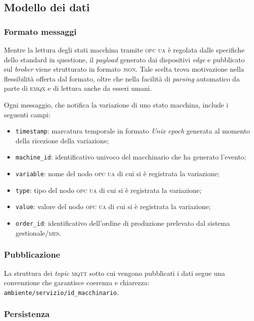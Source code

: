 \documentclass[12pt]{article}
\begin{document}
    \subsection{Modello dei dati}

    \subsubsection{Formato messaggi}

    Mentre la lettura degli stati macchina tramite \textsc{opc ua} è regolata dalle specifiche dello standard in questione, il \textit{payload} generato dai dispositivi \textit{edge} e pubblicato sul \textit{broker} viene strutturato in formato \textsc{json}. Tale scelta trova motivazione nella flessibilità offerta dal formato, oltre che nella facilità di \textit{parsing} automatico da parte di \textsc{emqx} e di lettura anche da esseri umani.

    Ogni messaggio, che notifica la variazione di uno stato macchina, include i seguenti campi:
    \begin{itemize}
        \item \verb|timestamp|: marcatura temporale in formato \textit{Unix epoch} generata al momento della ricezione della variazione;
        \item \verb|machine_id|: identificativo univoco del macchinario che ha generato l'evento;
        \item \verb|variable|: nome del nodo \textsc{opc ua} di cui si è registrata la variazione;
        \item \verb|type|: tipo del nodo \textsc{opc ua} di cui si è registrata la variazione;
        \item \verb|value|: valore del nodo \textsc{opc ua} di cui si è registrata la variazione;
        \item \verb|order_id|: identificativo dell'ordine di produzione prelevato dal sistema gestionale/\textsc{mes}.
    \end{itemize}

    \subsubsection{Pubblicazione}

    La struttura dei \textit{topic} \textsc{mqtt} sotto cui vengono pubblicati i dati segue una convenzione che garantisce coerenza e chiarezza: \verb|ambiente/servizio/id_macchinario|.

    \subsubsection{Persistenza}
    
\end{document}
